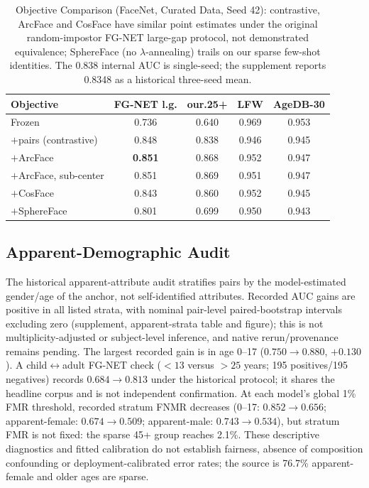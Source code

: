 \documentclass[journal]{IEEEtran}
\begin{document}
\begin{table}[!t]
\renewcommand{\arraystretch}{1.2}
\caption{Objective Comparison (FaceNet, Curated Data, Seed 42): contrastive, ArcFace and CosFace have similar point estimates under the original random-impostor FG-NET large-gap protocol, not demonstrated equivalence; SphereFace (no $\lambda$-annealing) trails on our sparse few-shot identities. The 0.838 internal AUC is single-seed; the supplement reports 0.8348 as a historical three-seed mean.}
\label{tab:objective}
\centering
\footnotesize
\begin{tabular}{@{}lcccc@{}}
\toprule
Objective & FG-NET l.g. & our.25+ & LFW & AgeDB-30 \\
\midrule
Frozen & 0.736 & 0.640 & 0.969 & 0.953 \\
$+$pairs (contrastive) & 0.848 & 0.838 & 0.946 & 0.945 \\
$+$ArcFace & \textbf{0.851} & 0.868 & 0.952 & 0.947 \\
$+$ArcFace, sub-center & 0.851 & 0.869 & 0.951 & 0.947 \\
$+$CosFace & 0.843 & 0.860 & 0.952 & 0.945 \\
$+$SphereFace & 0.801 & 0.699 & 0.950 & 0.943 \\
\bottomrule
\end{tabular}
\end{table}

\subsection{Apparent-Demographic Audit}\label{sec:res-fairness}
The historical apparent-attribute audit stratifies pairs by the model-estimated gender/age of the anchor, not self-identified attributes. Recorded AUC gains are positive in all listed strata, with nominal pair-level paired-bootstrap intervals excluding zero (supplement, apparent-strata table and figure); this is not multiplicity-adjusted or subject-level inference, and native rerun/provenance remains pending. The largest recorded gain is in age 0--17 ($0.750\to0.880$, $+0.130$). A child$\leftrightarrow$adult FG-NET check ($<13$ versus $>25$ years; 195 positives/195 negatives) records $0.684\to0.813$ under the historical protocol; it shares the headline corpus and is not independent confirmation. At each model's global 1\% FMR threshold, recorded stratum FNMR decreases (0--17: $0.852\to0.656$; apparent-female: $0.674\to0.509$; apparent-male: $0.743\to0.534$), but stratum FMR is not fixed: the sparse 45+ group reaches 2.1\%. These descriptive diagnostics and fitted calibration do not establish fairness, absence of composition confounding or deployment-calibrated error rates; the source is 76.7\% apparent-female and older ages are sparse.
\end{document}
